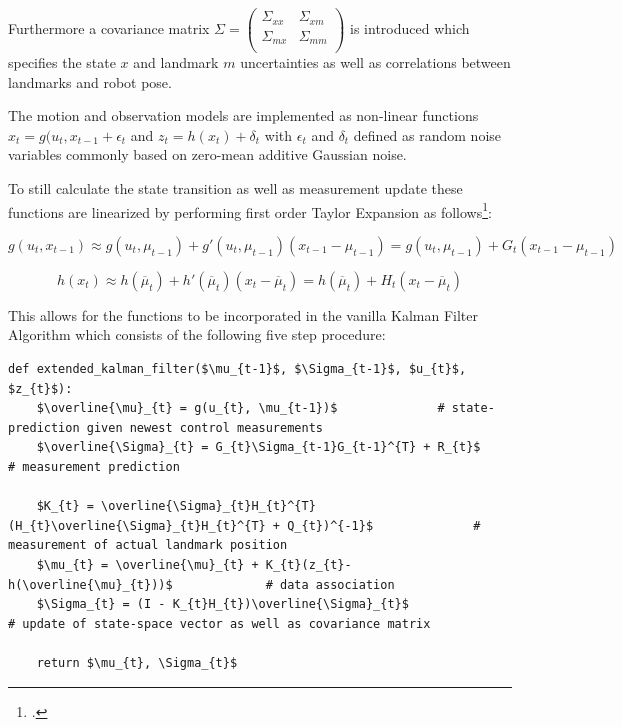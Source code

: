 Furthermore a covariance matrix 
$ \Sigma = 
\begin{pmatrix}
	\Sigma_{xx} & \Sigma_{xm} \\
	\Sigma_{mx} & \Sigma_{mm} \\
\end{pmatrix} $ 
is introduced which specifies the state $ x $ and landmark $ m $ uncertainties as well as correlations between landmarks and robot pose. 

The motion and observation models are implemented as non-linear functions $x_{t} = g(u_{t}, x_{t - 1} + \epsilon_{t}$ and $z_{t} = h(x_{t}) + \delta_{t}$ with $\epsilon_{t}$ and $\delta_{t}$ defined as random noise variables commonly based on zero-mean additive Gaussian noise.

To still calculate the state transition as well as measurement update these functions are linearized by performing first order Taylor Expansion as follows\footcite[Pages 33-51]{thrun2002probabilisticRobotics}:

\begin{equation}
	g(u_{t}, x_{t - 1}) \approx g(u_{t}, \mu_{t - 1}) + g'(u_{t}, \mu_{t - 1})(x_{t - 1} - \mu_{t - 1}) 
	= g(u_{t}, \mu_{t - 1}) + G_{t}(x_{t - 1} - \mu_{t - 1})
\end{equation}

\begin{equation}
	h(x_{t}) \approx h(\overline{\mu}_{t}) + h'(\overline{\mu}_{t})(x_{t} - \overline{\mu}_{t}) 
	= h(\overline{\mu}_{t}) + H_{t}(x_{t} - \overline{\mu}_{t})
\end{equation}

This allows for the functions to be incorporated in the vanilla Kalman Filter Algorithm which consists of the following five step procedure:

\begin{lstlisting}[mathescape=true, caption={Pseudo-Code describing the filter cycle of a Extenden Kalman Filter},captionpos=b,label={lst:kalman_filter}]
	def extended_kalman_filter($\mu_{t-1}$, $\Sigma_{t-1}$, $u_{t}$, $z_{t}$):
	$\overline{\mu}_{t} = g(u_{t}, \mu_{t-1})$				# state-prediction given newest control measurements
	$\overline{\Sigma}_{t} = G_{t}\Sigma_{t-1}G_{t-1}^{T} + R_{t}$				# measurement prediction 	 		
	
	$K_{t} = \overline{\Sigma}_{t}H_{t}^{T}(H_{t}\overline{\Sigma}_{t}H_{t}^{T} + Q_{t})^{-1}$				# measurement of actual landmark position
	$\mu_{t} = \overline{\mu}_{t} + K_{t}(z_{t}-h(\overline{\mu}_{t}))$				# data association 
	$\Sigma_{t} = (I - K_{t}H_{t})\overline{\Sigma}_{t}$				# update of state-space vector as well as covariance matrix 
	
	return $\mu_{t}, \Sigma_{t}$
\end{lstlisting}

